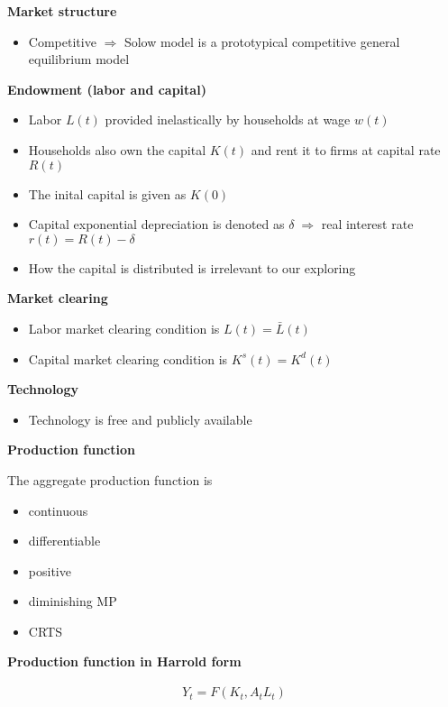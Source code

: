 \documentclass{article}
\providecommand{\tightlist}{
  \setlength{\itemsep}{0pt}
  \setlength{\parskip}{0pt}}
\begin{document}
\textbf{Market structure} 

\begin{itemize}
  \item Competitive $\Rightarrow$ Solow model is a prototypical competitive general equilibrium model
\end{itemize}

\textbf{Endowment (labor and capital)} 

\begin{itemize}
\tightlist
  \item Labor $L(t)$ provided inelastically by households at wage $w(t)$ 
  \item Households also own the capital $K(t)$ and rent it to firms at capital rate $R(t)$ 
  \item The inital capital is given as $K(0)$ 
  \item Capital exponential depreciation is denoted as $\delta \; \Rightarrow$ real interest rate $r(t)=R(t)-\delta$
  \item How the capital is distributed is irrelevant to our exploring
\end{itemize}

\textbf{Market clearing} 

\begin{itemize}
\tightlist
  \item Labor market clearing condition is $L(t)=\bar{L}(t)$ 
  \item Capital market clearing condition is $K^{s}(t)=K^{d}(t)$
\end{itemize}

\textbf{Technology} 
\begin{itemize}
  \item Technology is free and publicly available
\end{itemize}

\textbf{Production function} 

The aggregate production function is 
\begin{itemize}
\tightlist
  \item continuous 
  \item differentiable 
  \item positive 
  \item diminishing MP 
  \item CRTS
\end{itemize}

\textbf{Production function in Harrold form}

\begin{align}
Y_{t}=F(K_{t},A_{t}L_{t})
\end{align}
\end{document}
